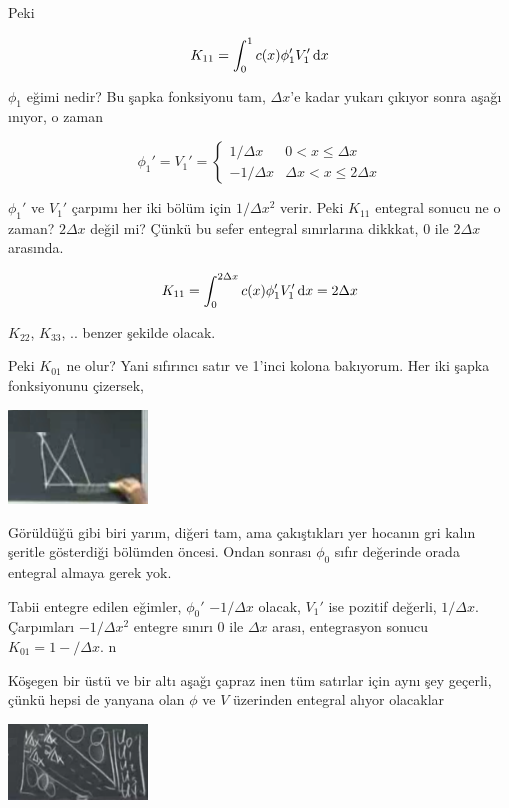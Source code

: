 \documentclass[12pt,fleqn]{article}\usepackage{../../common}
\begin{document}
Peki

$$
K_{11} = \int _{0}^{1} c(x) \phi_1' V_1' \,\mathrm{d} x
$$

$\phi_1$ eğimi nedir? Bu şapka fonksiyonu tam, $\Delta x$'e kadar yukarı
çıkıyor sonra aşağı ınıyor, o zaman

$$
\phi_1' = V_1' =
\left\{ \begin{array}{rc}
1/\Delta x & 0 < x \le \Delta x \\
-1/\Delta x & \Delta x < x \le 2\Delta x 
\end{array} \right.
$$

$\phi_1'$ ve $V_1'$ çarpımı her iki bölüm için $1/\Delta x^2$ verir. Peki
$K_{11}$ entegral sonucu ne o zaman? $2 \Delta x$ değil mi? Çünkü bu sefer
entegral sınırlarına dikkkat, 0 ile $2\Delta x$ arasında. 

$$
K_{11} = \int _{0}^{2\Delta x} c(x) \phi_1' V_1' \,\mathrm{d} x = 2\Delta x
$$

$K_{22}$, $K_{33}$, .. benzer şekilde olacak. 

Peki $K_{01}$ ne olur? Yani sıfırıncı satır ve 1'inci kolona bakıyorum. Her iki
şapka fonksiyonunu çizersek,

\includegraphics[width=10em]{compscieng_1_18_07.png}

Görüldüğü gibi biri yarım, diğeri tam, ama çakıştıkları yer hocanın gri
kalın şeritle gösterdiği bölümden öncesi. Ondan sonrası $\phi_0$ sıfır
değerinde orada entegral almaya gerek yok. 

Tabii entegre edilen eğimler, $\phi_0'$ $-1/\Delta x$ olacak, $V_1'$ ise
pozitif değerli, $1/\Delta x$. Çarpımları $-1/\Delta x^2$ entegre sınırı 0 ile
$\Delta x$ arası, entegrasyon sonucu $K_{01} = 1-/\Delta x$. n

Köşegen bir üstü ve bir altı aşağı çapraz inen tüm satırlar için aynı şey
geçerli, çünkü hepsi de yanyana olan $\phi$ ve $V$ üzerinden entegral alıyor
olacaklar

\includegraphics[width=10em]{compscieng_1_18_08.png}
\end{document}
